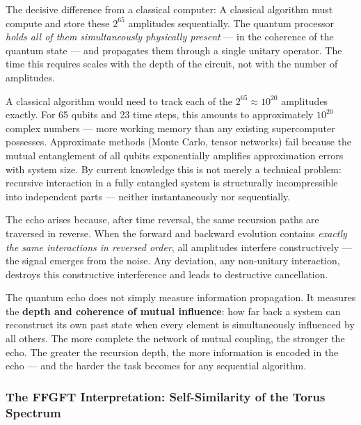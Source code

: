 The decisive difference from a classical computer:
A classical algorithm must compute and store these $2^{65}$ amplitudes sequentially.
The quantum processor \emph{holds all of them simultaneously physically present} —
in the coherence of the quantum state — and propagates them through a single unitary
operator. The time this requires scales with the depth of the circuit, not with the
number of amplitudes.

\begin{technical}
A classical algorithm would need to track each of the $2^{65} \approx 10^{20}$
amplitudes exactly. For 65 qubits and 23 time steps, this amounts to approximately
$10^{20}$ complex numbers — more working memory than any existing supercomputer
possesses. Approximate methods (Monte Carlo, tensor networks) fail because the mutual
entanglement of all qubits exponentially amplifies approximation errors with system
size. By current knowledge this is not merely a technical problem: recursive interaction in a
fully entangled system is structurally incompressible into independent parts —
neither instantaneously nor sequentially.
\end{technical}

The echo arises because, after time reversal, the same recursion paths are traversed
in reverse. When the forward and backward evolution contains \emph{exactly the same
interactions in reversed order}, all amplitudes interfere constructively — the signal
emerges from the noise. Any deviation, any non-unitary interaction, destroys this
constructive interference and leads to destructive cancellation.

\begin{keypoint}
The quantum echo does not simply measure information propagation. It measures the
\textbf{depth and coherence of mutual influence}: how far back a system can
reconstruct its own past state when every element is simultaneously influenced by
all others.
The more complete the network of mutual coupling, the stronger the echo.
The greater the recursion depth, the more information is encoded in the echo — and
the harder the task becomes for any sequential algorithm.
\end{keypoint}

\subsubsection*{The FFGFT Interpretation: Self-Similarity of the Torus Spectrum}

